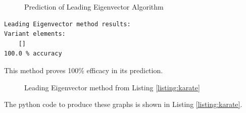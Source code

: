 \begin{figure}[h!]
\centering
{}
\caption{Prediction of Leading Eigenvector Algorithm}
\label{fig:graph_le}
\end{figure}

\begin{verbatim}
Leading Eigenvector method results: 
Variant elements:
	[]
100.0 % accuracy
\end{verbatim}

This method proves 100\% efficacy in its prediction.

\begin{figure}[h!]
\centering
{}
\caption{Leading Eigenvector method from Listing \ref{listing:karate}}
\label{fig:output2}
\end{figure}

\clearpage

The python code to produce these graphs is shown in Listing \ref{listing:karate}.

